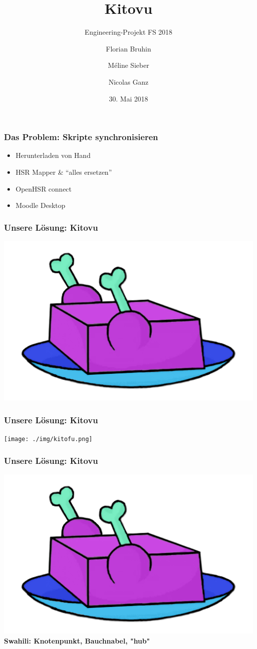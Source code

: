 \documentclass{beamer}
\title{Kitovu %
}
\subtitle{Engineering-Projekt FS 2018}
\author{Florian Bruhin \and Méline Sieber \and Nicolas Ganz}
\institute{HSR Hochschule für Technik Rapperswil}
\date{30. Mai 2018}
\begin{document}
  \maketitle
	
	\begin{frame}
	\frametitle{Das Problem: Skripte synchronisieren}
    \begin{itemize}
      \item Herunterladen von Hand
      \item HSR Mapper \& ``alles ersetzen''
      \item OpenHSR connect
      \item Moodle Desktop
    \end{itemize}
	\end{frame}
	
	\begin{frame}
	\frametitle{Unsere Lösung: Kitovu}
	\begin{center}
		\includegraphics[width=0.5\linewidth]{../../img/logo/kitovu.jpg}
	\end{center}
	\end{frame}

	\begin{frame}
		\frametitle{Unsere Lösung: Kitovu}
		\begin{center}
			\texttt{[image: ./img/kitofu.png]}
		\end{center}
	\end{frame}

		\begin{frame}
			\frametitle{Unsere Lösung: Kitovu}
			\begin{center}
				\includegraphics[width=0.5\linewidth]{../../img/logo/kitovu.jpg} \\
				\textbf{Swahili: Knotenpunkt, Bauchnabel, "hub"}
			\end{center}
		\end{frame}
	
\end{document}
